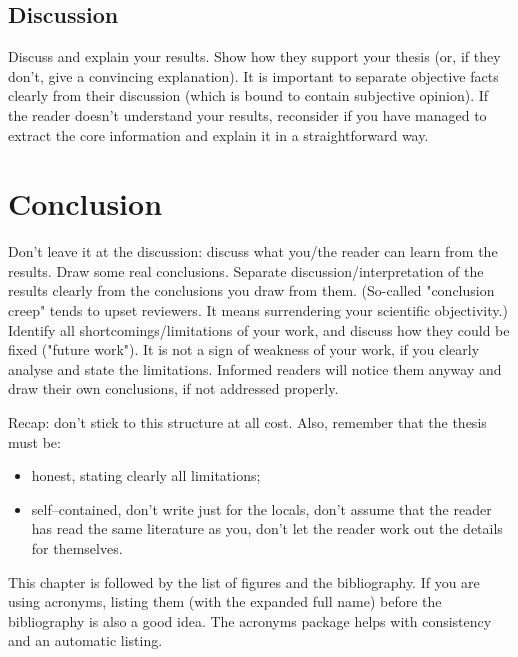 \documentclass[a4paper,twoside, openright,12pt]{report}
\begin{document}
\section{Discussion}

Discuss and explain your results. Show how they support your thesis (or, if they don't, give a convincing explanation). It is important to separate objective facts clearly from their discussion (which is bound to contain subjective opinion). If the reader doesn't understand your results, reconsider if you have managed to extract the core information and explain it in a straightforward way.




\chapter{Conclusion}

Don't leave it at the discussion: discuss what you/the reader can learn from the results. Draw some real conclusions. Separate discussion/interpretation of the results clearly from the conclusions you draw from them. (So-called "conclusion creep" tends to upset reviewers. It means surrendering your scientific objectivity.) Identify all shortcomings/limitations of your work, and discuss how they could be fixed ("future work"). It is not a sign of weakness of your work, if you clearly analyse and state the limitations. Informed readers will notice them anyway and draw their own conclusions, if not addressed properly.

\vspace{\baselineskip}
Recap: don't stick to this structure at all cost. Also, remember that the thesis must be:

\begin{itemize}
	\item honest, stating clearly all limitations;
	\item self--contained, don't write just for the locals, don't assume that the reader has read the same literature as you, don't let the reader work out the details for themselves.
\end{itemize}



This chapter is followed by the list of figures and the bibliography. If you are using acronyms, listing them (with the expanded full name) before the bibliography is also a good idea. The acronyms package helps with consistency and an automatic listing.
\end{document}
